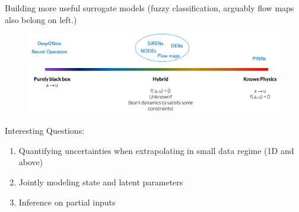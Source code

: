 \documentclass[usenames,dvipsnames]{beamer}
\theoremstyle{definition}
\begin{document}




\begin{frame}{Building more useful surrogate models}
(fuzzy classification, arguably flow maps also belong on left.)


\begin{figure}
    \centering
    \includegraphics[width=0.95\linewidth]{SpectrumOfPDESolvingApproaches.png}
    \label{fig:spectrum_pde}
\end{figure}


Interesting Questions:
\begin{enumerate}
    \item Quantifying uncertainties when extrapolating in small data regime (1D and above)

    \item Jointly modeling state and latent parameters

    \item Inference on partial inputs
\end{enumerate}

\end{frame}
\end{document}
